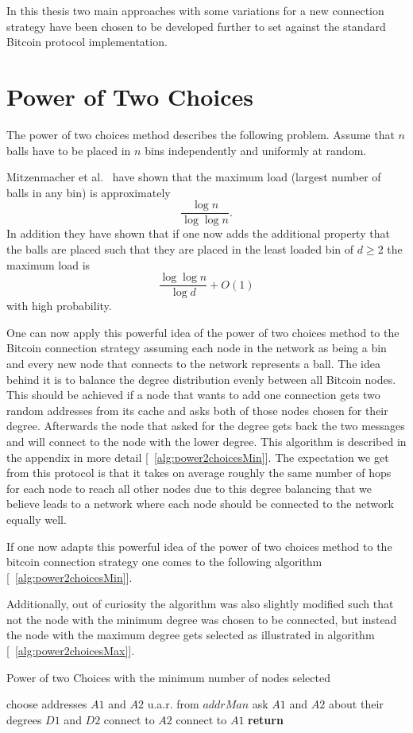 \documentclass[a4paper, oneside]{discothesis}
\begin{document}
In this thesis two main approaches with some variations for a new connection strategy have been chosen to be developed further to set against the standard Bitcoin protocol implementation.

\section{Power of Two Choices}
The power of two choices method describes the following problem. Assume that $n$ balls have to be placed in $n$ bins independently and uniformly at random.

Mitzenmacher et al.~\cite{Power2Choices} have shown that the maximum load (largest number of balls in any bin) is approximately $$\frac{\log n}{\log \log n}.$$
In addition they have shown that if one now adds the additional property that the balls are placed such that they are placed in the least loaded bin of $d \geq 2$ the maximum load is $$\frac{\log \log n}{ \log d} + O(1)$$ with high probability.

One can now apply this powerful idea of the power of two choices method to the Bitcoin connection strategy assuming each node in the network as being a bin and every new node that connects to the network represents a ball.
The idea behind it is to balance the degree distribution evenly between all Bitcoin nodes. This should be achieved if a node that wants to add one connection gets two random addresses from its cache and asks both of those nodes chosen for their degree. Afterwards the node that asked for the degree gets back the two messages and will connect to the node with the lower degree. This algorithm is described in the appendix in more detail [~\ref{alg:power2choicesMin}].
The expectation we get from this protocol is that it takes on average roughly the same number of hops for each node to reach all other nodes due to this degree balancing that we believe leads to a network where each node should be connected to the network equally well.

If one now adapts this powerful idea of the power of two choices method to the bitcoin connection strategy one comes to the following algorithm [~\ref{alg:power2choicesMin}].

Additionally, out of curiosity the algorithm was also slightly modified such that not the node with the minimum degree was chosen to be connected, but instead the node with the maximum degree gets selected as illustrated in algorithm [~\ref{alg:power2choicesMax}].

\begin{algorithm}
\caption{Power of two Choices with the minimum number of nodes selected} \label{alg:power2choicesMin}
\begin{algorithmic}[1]
 
    \State choose addresses $A1$ and $A2$ u.a.r. from $addrMan$
    \State ask $A1$ and $A2$ about their degrees $D1$ and $D2$
        \State connect to $A2$
    \Else
        \State connect to $A1$
    \EndIf
\EndWhile
\State \textbf{return} 
\EndProcedure
\end{algorithmic}
\end{algorithm}
\end{document}
